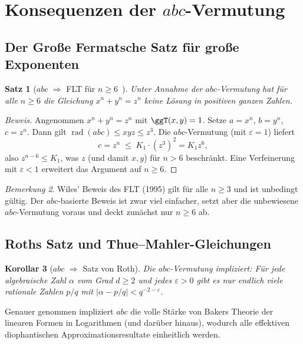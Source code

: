 \documentclass[12pt,a4paper]{article}
\newtheorem{theorem}{Satz}[section]
\newtheorem{corollary}[theorem]{Korollar}
\theoremstyle{remark}
\newtheorem{remark}[theorem]{Bemerkung}
\begin{document}
\section{Konsequenzen der $abc$-Vermutung}

\subsection{Der Große Fermatsche Satz für große Exponenten}

\begin{theorem}[$abc$ $\Rightarrow$ FLT für $n \geq 6$~\cite{Granville1990}]
  Unter Annahme der $abc$-Vermutung hat für alle $n \geq 6$ die Gleichung
  $x^n + y^n = z^n$ keine Lösung in positiven ganzen Zahlen.
\end{theorem}

\begin{proof}[Beweis]
  Angenommen $x^n + y^n = z^n$ mit $\ggT(x,y)=1$. Setze $a=x^n$, $b=y^n$, $c=z^n$.
  Dann gilt $\operatorname{rad}(abc) \leq xyz \leq z^3$. Die $abc$-Vermutung (mit
  $\varepsilon=1$) liefert
  \[
    c = z^n \;\leq\; K_1 \cdot (z^3)^2 = K_1 z^6,
  \]
  also $z^{n-6}\leq K_1$, was $z$ (und damit $x, y$) für $n>6$ beschränkt. Eine
  Verfeinerung mit $\varepsilon < 1$ erweitert das Argument auf $n\geq 6$.
\end{proof}

\begin{remark}
  Wiles' Beweis des FLT (1995) gilt für alle $n\geq 3$ und ist unbedingt gültig.
  Der $abc$-basierte Beweis ist zwar viel einfacher, setzt aber die unbewiesene
  $abc$-Vermutung voraus und deckt zunächst nur $n\geq 6$ ab.
\end{remark}

\subsection{Roths Satz und Thue--Mahler-Gleichungen}

\begin{corollary}[$abc$ $\Rightarrow$ Satz von Roth]
  Die $abc$-Vermutung impliziert: Für jede algebraische Zahl $\alpha$ vom Grad $d\geq 2$
  und jedes $\varepsilon>0$ gibt es nur endlich viele rationale Zahlen $p/q$ mit
  $|\alpha - p/q| < q^{-2-\varepsilon}$.
\end{corollary}

Genauer genommen impliziert $abc$ die volle Stärke von Bakers Theorie der linearen Formen
in Logarithmen (und darüber hinaus), wodurch alle effektiven diophantischen
Approximationsresultate einheitlich werden.
\end{document}
